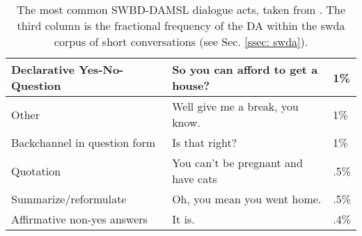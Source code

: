 \begin{table}[ht]
\begin{tabular}{|l|l|l|}
            Declarative Yes-No-Question  & So you can afford to get a house?               & 1\%         \\ \hline
            Other                        & Well give me a break, you know.                 & 1\%         \\ \hline
            Backchannel in question form & Is that right?                                  & 1\%         \\ \hline
            Quotation                    & You can't be pregnant and have cats             & .5\%        \\ \hline
            Summarize/reformulate        & Oh, you mean you went home.                     & .5\%        \\ \hline
            Affirmative non-yes answers  & It is.                                          & .4\%        \\ \hline
        \end{tabular}
        \caption{The most common SWBD-DAMSL dialogue acts, taken from \cite{swda}. The third column is the fractional frequency of the DA within the \gls{swda} corpus of short conversations (see Sec. \ref{ssec: swda}).}
        \label{table: damsl das}
        \end{table} 
        

    
        
        
    
    